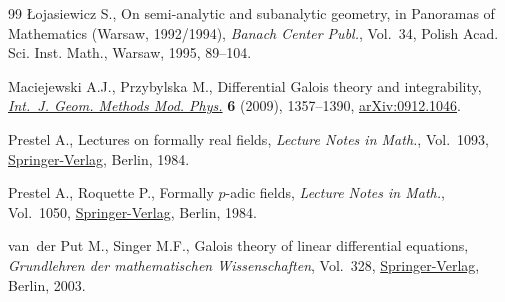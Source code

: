 \documentclass[pdftex]{sigma}%
\numberwithin{equation}{section}
\begin{document}
\begin{thebibliography}{99}
{\L}ojasiewicz S., On semi-analytic and subanalytic geometry, in Panoramas of
 Mathematics ({W}arsaw, 1992/1994), \textit{Banach Center Publ.}, Vol.~34,
 Polish Acad. Sci. Inst. Math., Warsaw, 1995, 89--104.

Maciejewski A.J., Przybylska M., Differential {G}alois theory and
 integrability, \href{https://doi.org/10.1142/S0219887809004272}{\textit{Int.~J. Geom. Methods Mod. Phys.}} \textbf{6} (2009),
 1357--1390, \href{https://arxiv.org/abs/0912.1046}{arXiv:0912.1046}.

Prestel A., Lectures on formally real fields, \textit{Lecture Notes in Math.},
 Vol.~1093, \href{https://doi.org/10.1007/BFb0101548}{Springer-Verlag}, Berlin, 1984.

Prestel A., Roquette P., Formally {$p$}-adic fields, \textit{Lecture Notes in
 Math.}, Vol.~1050, \href{https://doi.org/10.1007/BFb0071461}{Springer-Verlag}, Berlin, 1984.

van~der Put M., Singer M.F., Galois theory of linear differential equations,
 \textit{Grundlehren der mathematischen Wissenschaften}, Vol.~328,
 \href{https://doi.org/10.1007/978-3-642-55750-7}{Springer-Verlag}, Berlin, 2003.

\end{thebibliography}\LastPageEnding
\end{document}
